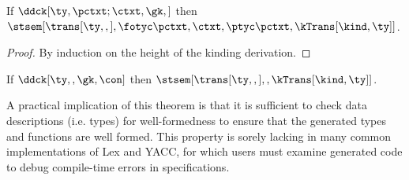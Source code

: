 \begin{lemma}
\label{thm:type-correctness}
  If $\ddck[\ty,{\pctxt;\ctxt},\gk,{}]$ then
  $\stsem[{\trans[\ty,,]},{\fotyc \pctxt, \ctxt,\ptyc \pctxt},
            {\kTrans[\kind,\ty]}]$.
\end{lemma}

\begin{proof}
  By induction on the height of the kinding derivation.
\end{proof}

\begin{theorem}
  If $\ddck[\ty,,\gk,\con]$ then
  $\stsem[{\trans[\ty,,]},,\kTrans[\kind,\ty]]$.  
\end{theorem}

A practical implication of this theorem is that
it is sufficient to check data descriptions (i.e. \ddc{} types) for
well-formedness to ensure that the generated types and
functions are well formed. This property is sorely lacking in many
common implementations of Lex and YACC, for which users must examine
generated code to debug compile-time errors in
specifications.


